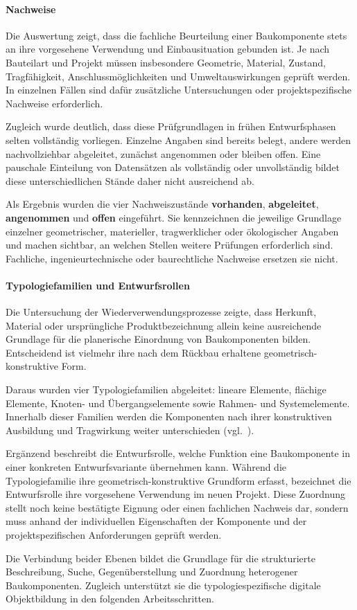 \documentclass[type=zwischenbericht]{zukunftbau}
\begin{document}
\begin{SemioNest}
\begin{SemioNest}
\paragraph{Nachweise}
Die Auswertung zeigt, dass die fachliche Beurteilung einer Baukomponente stets an ihre vorgesehene Verwendung und Einbausituation gebunden ist. Je nach Bauteilart und Projekt müssen insbesondere Geometrie, Material, Zustand, Tragfähigkeit, Anschlussmöglichkeiten und Umweltauswirkungen geprüft werden. In einzelnen Fällen sind dafür zusätzliche Untersuchungen oder projektspezifische Nachweise erforderlich.

Zugleich wurde deutlich, dass diese Prüfgrundlagen in frühen Entwurfsphasen selten vollständig vorliegen. Einzelne Angaben sind bereits belegt, andere werden nachvollziehbar abgeleitet, zunächst angenommen oder bleiben offen. Eine pauschale Einteilung von Datensätzen als vollständig oder unvollständig bildet diese unterschiedlichen Stände daher nicht ausreichend ab.

Als Ergebnis wurden die vier Nachweiszustände \textbf{vorhanden}, \textbf{abgeleitet}, \textbf{angenommen} und \textbf{offen} eingeführt. Sie kennzeichnen die jeweilige Grundlage einzelner geometrischer, materieller, tragwerklicher oder ökologischer Angaben und machen sichtbar, an welchen Stellen weitere Prüfungen erforderlich sind. Fachliche, ingenieurtechnische oder baurechtliche Nachweise ersetzen sie nicht.
\end{SemioNest}

\paragraph{Typologiefamilien und Entwurfsrollen}
Die Untersuchung der Wiederverwendungsprozesse zeigte, dass Herkunft, Material oder ursprüngliche Produktbezeichnung allein keine ausreichende Grundlage für die planerische Einordnung von Baukomponenten bilden. Entscheidend ist vielmehr ihre nach dem Rückbau erhaltene geometrisch-konstruktive Form.

Daraus wurden vier Typologiefamilien abgeleitet: lineare Elemente, flächige Elemente, Knoten- und Übergangselemente sowie Rahmen- und Systemelemente. Innerhalb dieser Familien werden die Komponenten nach ihrer konstruktiven Ausbildung und Tragwirkung weiter unterschieden (vgl.\ ).

Ergänzend beschreibt die Entwurfsrolle, welche Funktion eine Baukomponente in einer konkreten Entwurfsvariante übernehmen kann. Während die Typologiefamilie ihre geometrisch-konstruktive Grundform erfasst, bezeichnet die Entwurfsrolle ihre vorgesehene Verwendung im neuen Projekt. Diese Zuordnung stellt noch keine bestätigte Eignung oder einen fachlichen Nachweis dar, sondern muss anhand der individuellen Eigenschaften der Komponente und der projektspezifischen Anforderungen geprüft werden.

Die Verbindung beider Ebenen bildet die Grundlage für die strukturierte Beschreibung, Suche, Gegenüberstellung und Zuordnung heterogener Baukomponenten. Zugleich unterstützt sie die typologiespezifische digitale Objektbildung in den folgenden Arbeitsschritten.
\end{SemioNest}
\end{document}
